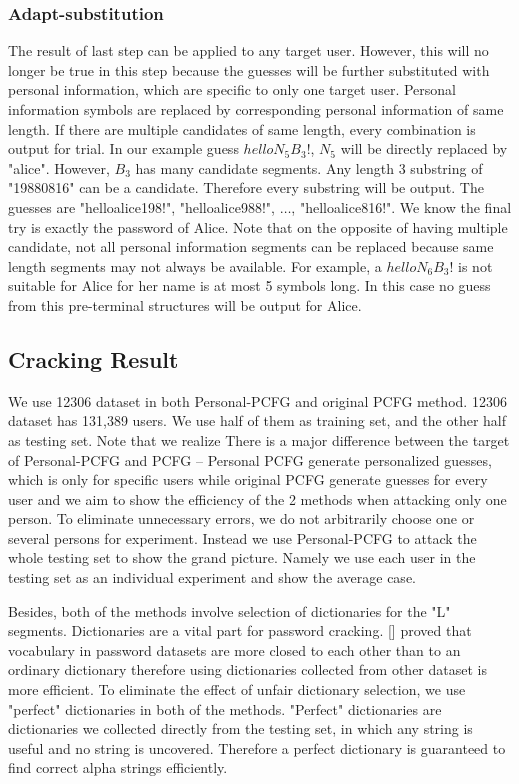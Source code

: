 \documentclass{sig-alternate}
\begin{document}
\subsubsection{Adapt-substitution}
The result of last step can be applied to any target user. However, this will no longer be true in this step because the guesses will be further substituted with personal information, which are specific to only one target user. Personal information symbols are replaced by corresponding personal information of same length. If there are multiple candidates of same length, every combination is output for trial. In our example guess $helloN_5B_3!$, $N_5$ will be directly replaced by "alice". However, $B_3$ has many candidate segments. Any length 3 substring of "19880816" can be a candidate. Therefore every substring will be output. The guesses are "helloalice198!", "helloalice988!", $\ldots$, "helloalice816!". We know the final try is exactly the password of Alice. Note that on the opposite of having multiple candidate, not all personal information segments can be replaced because same length segments may not always be available. For example, a $helloN_6B_3!$ is not suitable for Alice for her name is at most 5 symbols long. In this case no guess from this pre-terminal structures will be output for Alice. 

\subsection{Cracking Result}
We use 12306 dataset in both Personal-PCFG and original PCFG method. 12306 dataset has 131,389 users. We use half of them as training set, and the other half as testing set. Note that we realize There is a major difference between the target of Personal-PCFG and PCFG -- Personal PCFG generate personalized guesses, which is only for specific users while original PCFG generate guesses for every user and we aim to show the efficiency of the 2 methods when attacking only one person. To eliminate unnecessary errors, we do not arbitrarily choose one or several persons for experiment. Instead we use Personal-PCFG to attack the whole testing set to show the grand picture. Namely we use each user in the testing set as an individual experiment and show the average case. 

Besides, both of the methods involve selection of dictionaries for the "L" segments. Dictionaries are a vital part for password cracking. [] proved that vocabulary in password datasets are more closed to each other than to an ordinary dictionary therefore using dictionaries collected from other dataset is more efficient. To eliminate the effect of unfair dictionary selection, we use "perfect" dictionaries in both of the methods. "Perfect" dictionaries are dictionaries we collected directly from the testing set, in which any string is useful and no string is uncovered. Therefore a perfect dictionary is guaranteed to find correct alpha strings efficiently.
\end{document}
